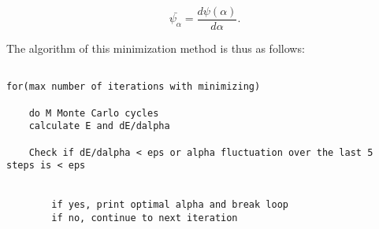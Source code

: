 \begin{equation}
	\bar{\psi_{\alpha}} = \frac{d \psi (\alpha)}{d \alpha}.
\end{equation}

The algorithm of this minimization method is thus as follows:

\lstset{basicstyle=\scriptsize}
\begin{lstlisting}

for(max number of iterations with minimizing)
	
	do M Monte Carlo cycles
	calculate E and dE/dalpha 
	
	Check if dE/dalpha < eps or alpha fluctuation over the last 5 steps is < eps
	
	
		if yes, print optimal alpha and break loop
		if no, continue to next iteration


\end{lstlisting}
